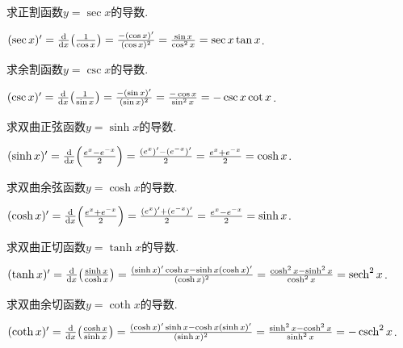 \begin{example}
求正割函数\(y=\sec x\)的导数.
\begin{solution}
\((\sec x)'
= \dv{x}(\frac1{\cos x})
= \frac{-(\cos x)'}{(\cos x)^2}
= \frac{\sin x}{\cos^2 x}
= \sec x \tan x\).
\end{solution}
\end{example}

\begin{example}
求余割函数\(y=\csc x\)的导数.
\begin{solution}
\((\csc x)'
= \dv{x}(\frac1{\sin x})
= \frac{-(\sin x)'}{(\sin x)^2}
= \frac{-\cos x}{\sin^2 x}
= -\csc x \cot x\).
\end{solution}
\end{example}

\begin{example}
求双曲正弦函数\(y = \sinh x\)的导数.
\begin{solution}
\((\sinh x)'
= \dv{x}(\frac{e^x - e^{-x}}2)
= \frac{(e^x)' - (e^{-x})'}2
= \frac{e^x + e^{-x}}2
= \cosh x\).
\end{solution}
\end{example}

\begin{example}
求双曲余弦函数\(y = \cosh x\)的导数.
\begin{solution}
\((\cosh x)'
= \dv{x}(\frac{e^x + e^{-x}}2)
= \frac{(e^x)' + (e^{-x})'}2
= \frac{e^x - e^{-x}}2
= \sinh x\).
\end{solution}
\end{example}

\begin{example}
求双曲正切函数\(y = \tanh x\)的导数.
\begin{solution}
\((\tanh x)'
= \dv{x}(\frac{\sinh x}{\cosh x})
= \frac{(\sinh x)' \cosh x - \sinh x (\cosh x)'}{(\cosh x)^2}
= \frac{\cosh^2 x - \sinh^2 x}{\cosh^2 x}
= \sech^2 x\).
\end{solution}
\end{example}

\begin{example}
求双曲余切函数\(y = \coth x\)的导数.
\begin{solution}
\((\coth x)'
= \dv{x}(\frac{\cosh x}{\sinh x})
= \frac{(\cosh x)' \sinh x - \cosh x (\sinh x)'}{(\sinh x)^2}
= \frac{\sinh^2 x - \cosh^2 x}{\sinh^2 x}
= -\csch^2 x\).
\end{solution}
\end{example}

